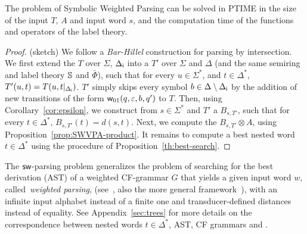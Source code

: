 %
%
\begin{proposition}
The problem of Symbolic Weighted Parsing
can be solved in PTIME in the size of the input \SWT $T$, \SWVPA $A$
and input word $s$,
and the computation time of the functions and operators of the label theory.
\end{proposition}
%
\begin{proof} (sketch)
We follow a \emph{Bar-Hillel} construction for parsing by intersection.
%
\noindent
We first extend the \SWT $T$ over $\Sigma$, ${\Delta_\mathsf{i}}$
into a \SWT $T'$ over $\Sigma$ and $\Delta$
(and the same semiring and label theory $\mathbb{S}$ and $\bar\Phi$),
such that for every $u \in \Sigma^*$, and $t \in {\Delta}^*$,
$T'(u, t) = T(u, t|_{{\Delta_\mathsf{i}}})$.
%
$T'$ simply skips every symbol
$b \in {\Delta} \setminus {\Delta_\mathsf{i}}$
by the addition 
of new transitions of the form $\mathsf{w}_{01}(q, \varepsilon, b, q')$ to $T$.
%
\noindent
Then, using Corollary~\ref{cor:epsilon},
we construct from $s \in \Sigma^*$ and $T'$
a \SWA $B_{s, T'}$,
such that for every $t \in \Delta^*$, $B_{s, T'}(t) = d(s, t)$.
%
%
\noindent
Next, %
we compute the \SWVPA $B_{s, T'} \otimes A$,
using Proposition~\ref{prop:SWVPA-product}.
%
\noindent
It remains to compute a best nested word $t \in {\Delta}^*$
using the procedure of Proposition~\ref{th:best-search}.
\end{proof}

The $\textsf{sw}$-parsing problem generalizes
the problem of searching for the best derivation (AST) of a weighted CF-grammar $G$
that yields a given input word $w$, called~\emph{weighted parsing},
(see~\cite{Goodman99SemiringParsing},
 also the more general framework~\cite{MorbitzVogler19weighted-parsing}),
with an infinite input alphabet instead of a finite one and
transducer-defined distances instead of equality. 
%
See Appendix~\ref{sec:trees} for more details on the correspondence between 
nested words $t \in \Delta^*$, AST, CF grammars and \SWVPA.

